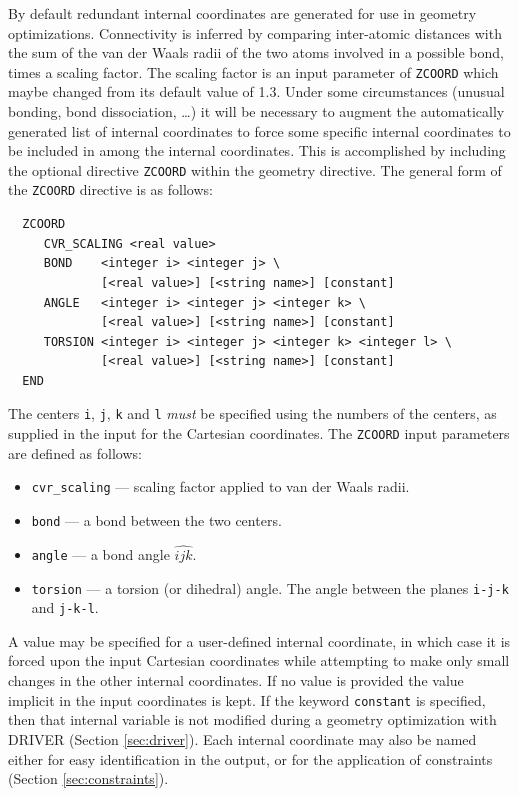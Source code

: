 By default redundant internal coordinates are generated for use in
geometry optimizations.  Connectivity is inferred by comparing
inter-atomic distances with the sum of the van der Waals radii of the
two atoms involved in a possible bond, times a scaling factor. The
scaling factor is an input parameter of \verb+ZCOORD+ which maybe
changed from its default value of 1.3.  Under some circumstances 
(unusual bonding, bond dissociation, \ldots) it will be necessary to
augment the automatically generated list of internal coordinates to
force some specific internal coordinates to be included in among the
internal coordinates.  This is accomplished by including the optional
directive {\tt ZCOORD} within the geometry directive.  The general
form of the \verb+ZCOORD+ directive is as follows:
\begin{verbatim}
  ZCOORD
     CVR_SCALING <real value>
     BOND    <integer i> <integer j> \
             [<real value>] [<string name>] [constant]
     ANGLE   <integer i> <integer j> <integer k> \
             [<real value>] [<string name>] [constant]
     TORSION <integer i> <integer j> <integer k> <integer l> \
             [<real value>] [<string name>] [constant]
  END
\end{verbatim}

The centers \verb+i+, \verb+j+, \verb+k+ and \verb+l+ {\em must} be
specified using the numbers of the centers, as supplied in the input
for the Cartesian coordinates.  The \verb+ZCOORD+ input parameters are
defined as follows:

\begin{itemize}
\item {\tt cvr\_scaling} --- scaling factor applied to van der Waals radii.
\item {\tt bond} --- a bond between the two centers.
\item {\tt angle} --- a bond angle $\widehat{ijk}$.
\item {\tt torsion} --- a torsion (or dihedral) angle.  The
  angle between the planes \verb+i-j-k+ and \verb+j-k-l+.
\end{itemize}   

A value may be specified for a user-defined internal coordinate, in
which case it is forced upon the input Cartesian coordinates while
attempting to make only small changes in the other internal
coordinates.  If no value is provided the value implicit in the input
coordinates is kept.  If the keyword \verb+constant+ is specified, then
that internal variable is not modified during a geometry optimization 
with DRIVER (Section \ref{sec:driver}).  Each internal coordinate may
also be named either for easy identification in the output, or
for the application of constraints (Section \ref{sec:constraints}).


